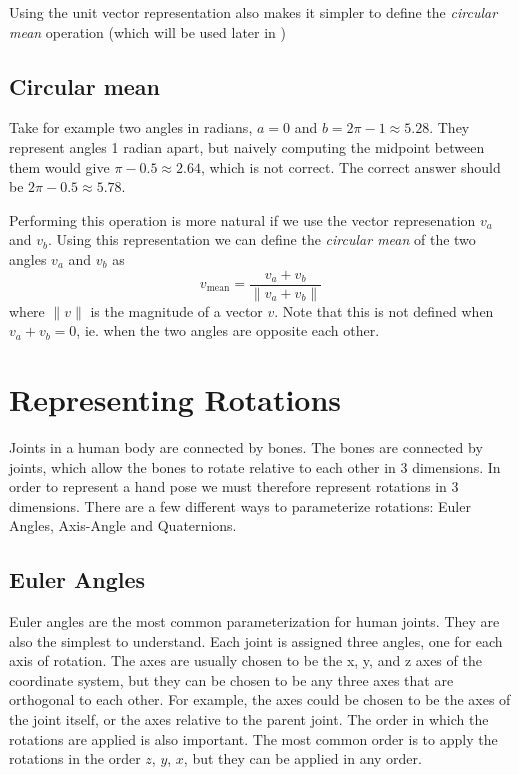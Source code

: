 Using the unit vector representation also makes it simpler to define the \textit{circular mean} operation (which will be used later in )

\subsection{Circular mean}
\label{ss:circ-mean}

Take for example two angles in radians, $a = 0$ and $b = 2\pi-1 \approx 5.28$. They represent angles 1 radian apart, but naively computing the midpoint between them would give $\pi-0.5 \approx 2.64$, which is not correct. The correct answer should be $2\pi-0.5 \approx 5.78$.

Performing this operation is more natural if we use the vector represenation $v_a$ and $v_b$. Using this representation we can define the \textit{circular mean} of the two angles $v_a$ and $v_b$ as
\begin{equation}
\label{eqn:circ-mean}
v_{\text{mean}} = \frac{v_a + v_b}{\|v_a + v_b\|}
\end{equation}
where $\|v\|$ is the magnitude of a vector $v$. Note that this is not defined when $v_a + v_b = 0$, ie. when the two angles are opposite each other.


\section{Representing Rotations}

Joints in a human body are connected by bones. The bones are connected by joints, which allow the bones to rotate relative to each other in 3 dimensions. In order to represent a hand pose we must therefore represent rotations in 3 dimensions. There are a few different ways to parameterize rotations: Euler Angles, Axis-Angle and Quaternions.

\subsection{Euler Angles}

Euler angles are the most common parameterization for human joints. They are also the simplest to understand. Each joint is assigned three angles, one for each axis of rotation. The axes are usually chosen to be the x, y, and z axes of the coordinate system, but they can be chosen to be any three axes that are orthogonal to each other.  For example, the axes could be chosen to be the axes of the joint itself, or the axes relative to the parent joint. The order in which the rotations are applied is also important. The most common order is to apply the rotations in the order $z$, $y$, $x$, but they can be applied in any order.

